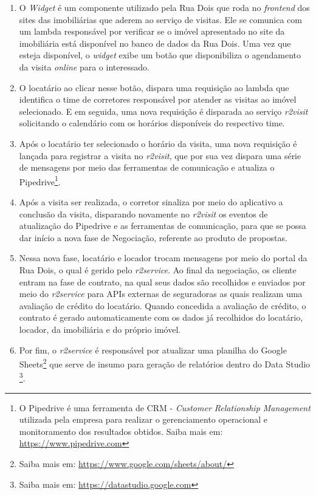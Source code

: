   \begin{enumerate}
    \item O \textit{Widget} é um componente utilizado pela Rua Dois que roda
      no \textit{frontend} dos sites das imobiliárias que aderem ao serviço
      de visitas. Ele se comunica com um lambda responsável por verificar se
      o imóvel apresentado no site da imobiliária está disponível no banco
      de dados da Rua Dois. Uma vez que esteja disponível, o \textit{widget}
      exibe um botão que disponibiliza o agendamento da visita \textit{online}
      para o interessado.
    \item O locatário ao clicar nesse botão, dispara uma requisição ao lambda
    que identifica o time de corretores responsável por atender as visitas
    ao imóvel selecionado. E em seguida, uma nova requisição é disparada ao
    serviço \textit{r2visit} solicitando o calendário com os horários
    disponíveis do respectivo time.
    \item Após o locatário ter selecionado o horário da visita, uma nova
    requisição é lançada para registrar a visita no \textit{r2visit}, que por
    sua vez dispara uma série de mensagens por meio das ferramentas de comunicação
    e atualiza o Pipedrive\footnote{O Pipedrive é uma ferramenta de CRM -
    \textit{Customer Relationship Management} utilizada pela empresa para
    realizar o gerenciamento operacional e monitoramento dos resultados obtidos.
    Saiba mais em: \url{https://www.pipedrive.com}}.
    \item Após a visita ser realizada, o corretor sinaliza por meio do aplicativo
    a conclusão da visita, disparando novamente no \textit{r2visit} os eventos
    de atualização do Pipedrive e as ferramentas de comunicação, para que se
    possa dar início a nova fase de Negociação, referente ao produto de propostas.
    \item Nessa nova fase, locatário e locador trocam mensagens por meio do portal
    da Rua Dois, o qual é gerido pelo \textit{r2service}. Ao final da negociação,
    os cliente entram na fase de contrato, na qual seus dados são recolhidos e
    enviados por meio do \textit{r2service} para APIs externas de seguradoras as quais
    realizam uma avaliação de crédito do locatário. Quando concedida a avaliação
    de crédito, o contrato é gerado automaticamente com os dados já recolhidos
    do locatário, locador, da imobiliária e do próprio imóvel.
    \item Por fim, o \textit{r2service} é responsável por atualizar uma planilha do
    Google Sheets\footnote{Saiba mais em: \url{https://www.google.com/sheets/about/}}
    que serve de insumo para geração de relatórios dentro do Data Studio
    \footnote{Saiba mais em: \url{https://datastudio.google.com}}.
  \end{enumerate}

